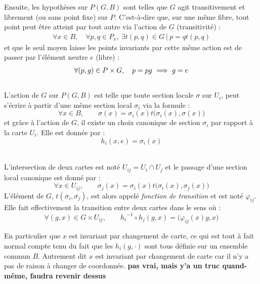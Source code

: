 Ensuite, les hypothèses sur $P(G,B)$ sont telles que $G$ agit transitivement et librement (ou sans point fixe) sur $P$. C'est-à-dire que, sur une même fibre, tout point peut être atteint par tout autre via l'action de $G$ (transitivité) :
\begin{align*}
	\forall x\in B,\quad \forall p,q\in P_x,\ \exists t(p,q)\in G\ |\ p = q t(p,q) 
\end{align*}
et que le seul moyen laisse les points invariants par cette même action est de passer par l'élément neutre $e$ (libre) :
\begin{align*}
	\forall (p,g)\in P\times G,\quad p = pg\ \Longrightarrow\ g=e
\end{align*}
\\
L'action de $G$ sur $P(G,B)$ est telle que toute section locale $\sigma$ sur $U_i$, peut s'écrire à partir d'une même section local $\sigma_i$ via la formule :
\[\forall x\in B,\qquad \sigma(x) = \sigma_i(x) t\big(\sigma_i(x), \sigma(x)\big)\]
et grâce à l'action de $G$, il existe un choix canonique de section $\sigma_i$ par rapport à la carte $U_i$. Elle est donnée par :
\[{h_i}(x,e) = \sigma_i(x)\]
\\
\begin{definition}
	L'intersection de deux cartes  est noté $U_{ij} = U_i\cap U_j$ et le passage d'une section local canonique est donné par :
	\[\forall x\in U_{ij},\qquad \sigma_j(x) = \sigma_i(x) t\big(\sigma_i(x), \sigma_j(x)\big)\]
	L'élément de $G$, $t(\sigma_i, \sigma_j)$, est alors appelé \emph{fonction de transition} et est noté $\varphi_{ij}$. Elle fait effectivement la transition entre deux cartes dans le sens où :
	\[\forall (g,x)\in G\times U_{ij},\qquad {h_i}^{-1} \circ h_j(g,x) = \big( \varphi_{ij}(x)g, x \big)\]
\end{definition}

\skipl
En particulier que $x$ est invariant par changement de carte, ce qui est tout à fait normal compte tenu du fait que les $h_i(g, \cdot)$ sont tous définie sur un ensemble commun $B$. Autrement dit $x$ est invariant par changement de carte car il n'y a pas de raison à changer de coordonnée. \textbf{pas vrai, mais y'a un truc quand-même, faudra revenir dessus}


